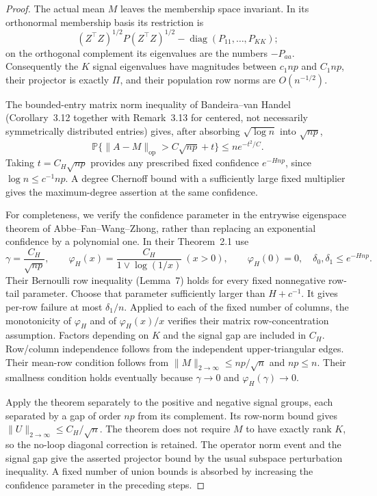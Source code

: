 \documentclass[11pt]{article}
\newcommand{\Prb}{\mathbb P}
\newcommand{\op}{\mathrm{op}}
\begin{document}
\begin{proof}
The actual mean $M$ leaves the membership space invariant. In its orthonormal membership basis its restriction is
\[
 (Z^\top Z)^{1/2}P(Z^\top Z)^{1/2}-\operatorname{diag}(P_{11},\ldots,P_{KK});
\]
on the orthogonal complement its eigenvalues are the numbers $-P_{aa}$. Consequently the $K$ signal eigenvalues have magnitudes between $c_1np$ and $C_1np$, their projector is exactly $\Pi$, and their population row norms are $O(n^{-1/2})$.

The bounded-entry matrix norm inequality of Bandeira--van Handel (Corollary~3.12 together with Remark~3.13 for centered, not necessarily symmetrically distributed entries) gives, after absorbing $\sqrt{\log n}$ into $\sqrt{np}$,
\[
 \Prb\{\|A-M\|_\op>C\sqrt{np}+t\}\le n e^{-t^2/C}.
\]
Taking $t=C_H\sqrt{np}$ provides any prescribed fixed confidence $e^{-Hnp}$, since $\log n\le c^{-1}np$. A degree Chernoff bound with a sufficiently large fixed multiplier gives the maximum-degree assertion at the same confidence.

For completeness, we verify the confidence parameter in the entrywise eigenspace theorem of Abbe--Fan--Wang--Zhong, rather than replacing an exponential confidence by a polynomial one. In their Theorem~2.1 use
\[
 \gamma=\frac{C_H}{\sqrt{np}},\qquad
 \varphi_H(x)=\frac{C_H}{1\vee\log(1/x)}\ (x>0),\qquad \varphi_H(0)=0,
 \quad \delta_0,\delta_1\le e^{-Hnp}.
\]
Their Bernoulli row inequality (Lemma~7) holds for every fixed nonnegative row-tail parameter. Choose that parameter sufficiently larger than $H+c^{-1}$. It gives per-row failure at most $\delta_1/n$. Applied to each of the fixed number of columns, the monotonicity of $\varphi_H$ and of $\varphi_H(x)/x$ verifies their matrix row-concentration assumption. Factors depending on $K$ and the signal gap are included in $C_H$. Row/column independence follows from the independent upper-triangular edges. Their mean-row condition follows from $\|M\|_{2\to\infty}\le np/\sqrt n$ and $np\le n$. Their smallness condition holds eventually because $\gamma\to0$ and $\varphi_H(\gamma)\to0$.

Apply the theorem separately to the positive and negative signal groups, each separated by a gap of order $np$ from its complement. Its row-norm bound gives $\|U\|_{2\to\infty}\le C_H/\sqrt n$. The theorem does not require $M$ to have exactly rank $K$, so the no-loop diagonal correction is retained. The operator norm event and the signal gap give the asserted projector bound by the usual subspace perturbation inequality. A fixed number of union bounds is absorbed by increasing the confidence parameter in the preceding steps.


\end{proof}
\end{document}
